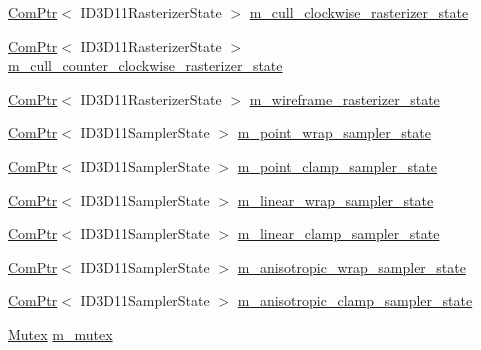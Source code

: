 \begin{DoxyCompactItemize}
\item 
\hyperlink{namespacemage_ae74f374780900893caa5555d1031fd79}{Com\+Ptr}$<$ I\+D3\+D11\+Rasterizer\+State $>$ \hyperlink{structmage_1_1_rendering_state_cache_a4194ce92cb7cccd2ae219e13eaf7cfdc}{m\+\_\+cull\+\_\+clockwise\+\_\+rasterizer\+\_\+state}
\item 
\hyperlink{namespacemage_ae74f374780900893caa5555d1031fd79}{Com\+Ptr}$<$ I\+D3\+D11\+Rasterizer\+State $>$ \hyperlink{structmage_1_1_rendering_state_cache_a825b91a2cb5ab76375d1ebebe7a0ef74}{m\+\_\+cull\+\_\+counter\+\_\+clockwise\+\_\+rasterizer\+\_\+state}
\item 
\hyperlink{namespacemage_ae74f374780900893caa5555d1031fd79}{Com\+Ptr}$<$ I\+D3\+D11\+Rasterizer\+State $>$ \hyperlink{structmage_1_1_rendering_state_cache_a2fddb539c6cb42feb3c54b73ad2fe800}{m\+\_\+wireframe\+\_\+rasterizer\+\_\+state}
\item 
\hyperlink{namespacemage_ae74f374780900893caa5555d1031fd79}{Com\+Ptr}$<$ I\+D3\+D11\+Sampler\+State $>$ \hyperlink{structmage_1_1_rendering_state_cache_ae4011d6ce5effbacf3fd69ffa5d46ebc}{m\+\_\+point\+\_\+wrap\+\_\+sampler\+\_\+state}
\item 
\hyperlink{namespacemage_ae74f374780900893caa5555d1031fd79}{Com\+Ptr}$<$ I\+D3\+D11\+Sampler\+State $>$ \hyperlink{structmage_1_1_rendering_state_cache_ad53e96f5527120d6cfed5a4759dc0d41}{m\+\_\+point\+\_\+clamp\+\_\+sampler\+\_\+state}
\item 
\hyperlink{namespacemage_ae74f374780900893caa5555d1031fd79}{Com\+Ptr}$<$ I\+D3\+D11\+Sampler\+State $>$ \hyperlink{structmage_1_1_rendering_state_cache_a7f7289f3759840045dbe3dd2785199a8}{m\+\_\+linear\+\_\+wrap\+\_\+sampler\+\_\+state}
\item 
\hyperlink{namespacemage_ae74f374780900893caa5555d1031fd79}{Com\+Ptr}$<$ I\+D3\+D11\+Sampler\+State $>$ \hyperlink{structmage_1_1_rendering_state_cache_a8086db2af33ea844744f3e81a4471af6}{m\+\_\+linear\+\_\+clamp\+\_\+sampler\+\_\+state}
\item 
\hyperlink{namespacemage_ae74f374780900893caa5555d1031fd79}{Com\+Ptr}$<$ I\+D3\+D11\+Sampler\+State $>$ \hyperlink{structmage_1_1_rendering_state_cache_ac44316b27ee83a1aeb9f8afc26b5a743}{m\+\_\+anisotropic\+\_\+wrap\+\_\+sampler\+\_\+state}
\item 
\hyperlink{namespacemage_ae74f374780900893caa5555d1031fd79}{Com\+Ptr}$<$ I\+D3\+D11\+Sampler\+State $>$ \hyperlink{structmage_1_1_rendering_state_cache_a56467ab3877bfb1fa547efe4e4a62cc7}{m\+\_\+anisotropic\+\_\+clamp\+\_\+sampler\+\_\+state}
\item 
\hyperlink{classmage_1_1_mutex}{Mutex} \hyperlink{structmage_1_1_rendering_state_cache_a97aad58b39eedbeeb27ed47c87ded52a}{m\+\_\+mutex}
\end{DoxyCompactItemize}


